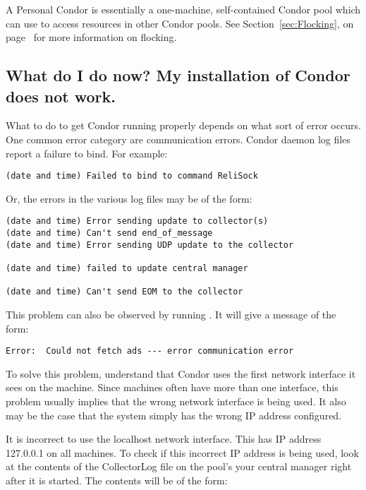 A Personal Condor is essentially a one-machine, self-contained Condor
pool which can use  to access resources in other Condor
pools.
See Section~\ref{sec:Flocking}, on page~\pageref{sec:Flocking} for
more information on flocking.


\subsection*{What do I do now? My installation of Condor does not work.}

What to do to get Condor running properly depends on what sort of
error occurs. 
One common error category are communication errors.
Condor daemon log files report a failure to bind.
For example:

\footnotesize
\begin{verbatim}
(date and time) Failed to bind to command ReliSock
\end{verbatim}
\normalsize

Or, the errors in the various log files may be of the form:

\footnotesize
\begin{verbatim}
(date and time) Error sending update to collector(s)
(date and time) Can't send end_of_message
(date and time) Error sending UDP update to the collector

(date and time) failed to update central manager

(date and time) Can't send EOM to the collector
\end{verbatim}
\normalsize

This problem can also be observed by running .
It will give a message of the form:
\footnotesize
\begin{verbatim}
Error:  Could not fetch ads --- error communication error
\end{verbatim}
\normalsize

To solve this problem, understand that
Condor uses the first network interface it sees on the machine.
Since machines often have more than one interface,
this problem usually implies that the wrong network
interface is being used.  It also may be the case that
the system simply has the wrong IP address configured.

It is incorrect to use the localhost network interface.
This has IP address 127.0.0.1 on all machines.
To check if this incorrect IP address is being used,
look at the contents of the
CollectorLog file on the pool's
your central manager right after it is started.  
The contents will be of the form:

